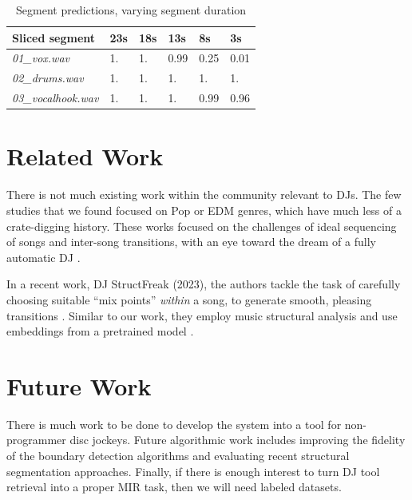 \documentclass{article}
\begin{document}
\begin{table}
 \begin{center}
 \begin{tabular}{llllll}
    \toprule
 	  Sliced segment & 23s & 18s & 13s & 8s & 3s \\
 	\midrule
	\textit{01\_vox.wav} & 1. & 1. & 0.99 & 0.25 & 0.01 \\
	\textit{02\_drums.wav} & 1. & 1. & 1. & 1. & 1. \\
	\textit{03\_vocalhook.wav} & 1. & 1. & 1. & 0.99 & 0.96\\
	\end{tabular}
\end{center}
 \caption{Segment predictions, varying segment duration}
 \label{tab:vox_class_ablation}
\end{table}

\section{Related Work}
There is not much existing work within the community relevant to DJs. The few studies that we found focused on Pop or EDM genres, which have much less of a crate-digging history. These works focused on the challenges of ideal sequencing of songs and inter-song transitions, with an eye toward the dream of a fully automatic DJ \cite{kim2017automatic, huang2017djnet, bittner2017automatic}.

In a recent work, DJ StructFreak (2023), the authors tackle the task of carefully choosing suitable ``mix points'' \textit{within} a song, to generate smooth, pleasing transitions \cite{kim2023dj}. Similar to our work, they employ music structural analysis and use embeddings from a pretrained model \cite{kim2023all}. 

\section{Future Work}
There is much work to be done to develop the system into a tool for non-programmer disc jockeys. Future algorithmic work includes improving the fidelity of the boundary detection algorithms and evaluating recent structural segmentation approaches\cite{kim2023all}. Finally, if there is enough interest to turn DJ tool retrieval into a proper MIR task, then we will need labeled datasets. 

\end{document}
